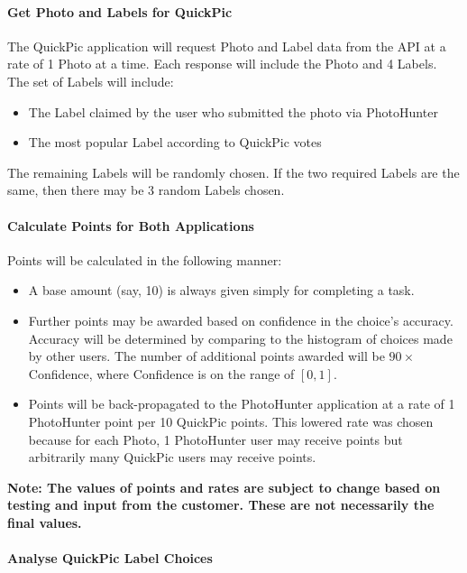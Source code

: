 \documentclass{article}
\begin{document}
\paragraph{Get Photo and Labels for QuickPic}

The QuickPic application will request Photo and Label data from the API at a
rate of 1 Photo at a time.  Each response will include the Photo and 4 Labels.
The set of Labels will include:

\begin{itemize}
  \item The Label claimed by the user who submitted the photo via PhotoHunter
  \item The most popular Label according to QuickPic votes
\end{itemize}

The remaining Labels will be randomly chosen.  If the two required Labels are
the same, then there may be 3 random Labels chosen.

\paragraph{Calculate Points for Both Applications}

Points will be calculated in the following manner:

\begin{itemize}
  \item A base amount (say, 10) is always given simply for completing a task.
  \item Further points may be awarded based on confidence in the choice's
    accuracy.  Accuracy will be determined by comparing to the histogram of
    choices made by other users.  The number of additional points awarded will
    be $90 \times$ Confidence, where Confidence is on the range of
    $[0, 1]$.

  \item Points will be back-propagated to the PhotoHunter application at a rate
    of 1 PhotoHunter point per 10 QuickPic points.  This lowered rate was
    chosen because for each Photo, 1 PhotoHunter user may receive points but
    arbitrarily many QuickPic users may receive points.
\end{itemize}

\textbf{Note: The values of points and rates are subject to change based on
  testing and input from the customer.  These are not necessarily the final
values.}

\paragraph{Analyse QuickPic Label Choices}
\end{document}
